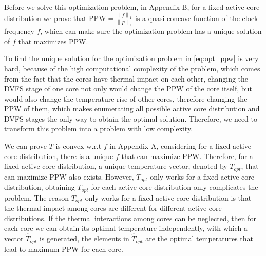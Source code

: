 Before we solve this optimization problem, in Appendix B, for a fixed active core distribution we prove that $\text{PPW}=\frac{\left \| f \right \|_{1}}{\left \| P \right \|_{1}}$ is a quasi-concave function of the clock frequency $f$, which can make sure the optimization problem has a unique solution of $f$ that maximizes PPW.

To find the unique solution for the optimization problem in \eqref{eq:opt_ppw} is very hard, because of the high computational complexity of the problem, which comes from the fact that the cores have thermal impact on each other, changing the DVFS stage of one core not only would change the PPW of the core itself, but would also change the temperature rise of other cores, therefore changing the PPW of them, which makes enumerating all possible active core distribution and DVFS stages the only way to obtain the optimal solution. Therefore, we need to transform this problem into a problem with low complexity.

We can prove $T$ is convex w.r.t $f$ in Appendix A, considering for a fixed active core distribution, there is a unique $f$ that can maximize PPW. Therefore, for a fixed active core distribution, a unique temperature vector, denoted by $T_{opt}$, that can maximize PPW also exists. However, $T_{opt}$ only works for a fixed active core distribution, obtaining $T_{opt}$ for each active core distribution only complicates the problem. The reason $T_{opt}$ only works for a fixed active core distribution is that the thermal impact among cores are different for different active core distributions. If the thermal interactions among cores can be neglected, then for each core we can obtain its optimal temperature independently, with which a vector $\hat{T}_{opt}$ is generated, the elements in $\hat{T}_{opt}$ are the optimal temperatures that lead to maximum PPW for each core.


